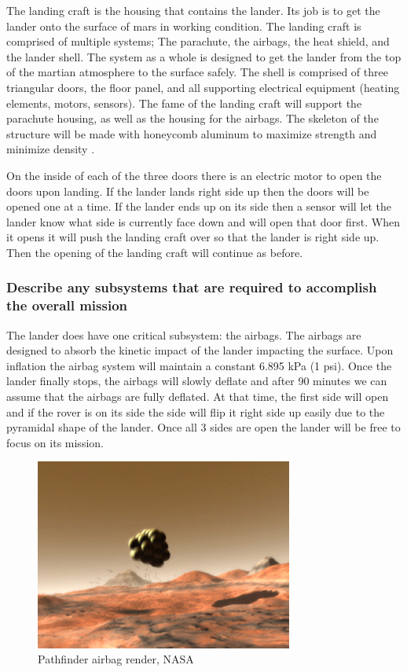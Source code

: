 \documentclass[%
 portrait,
 aapm,
 mph,%
 amsmath,amssymb,
 reprint,%
]{revtex4-2}
\begin{document}
The landing craft is the housing that contains the lander.  Its job is to get the lander onto the surface of mars in working condition.  The landing craft is comprised of multiple systems; The parachute, the airbags, the heat shield, and the lander shell.  The system as a whole is designed to get the lander from the top of the martian atmosphere to the surface safely.  The shell is comprised of three triangular doors, the floor panel, and all supporting electrical equipment (heating elements, motors, sensors).  The fame of the landing craft will support the parachute housing, as well as the housing for the airbags.  The skeleton of the structure will be made with honeycomb aluminum to maximize strength and minimize density \cite{zylonByToyobo}.

On the inside of each of the three doors there is an electric motor to open the doors upon landing.  If the lander lands right side up then the doors will be opened one at a time.  If the lander ends up on its side then a sensor will let the lander know what side is currently face down and will open that door first.  When it opens it will push the landing craft over so that the lander is right side up.  Then the opening of the landing craft will continue as before. 


\subsubsection{Describe any subsystems that are required to accomplish the overall mission}
The lander does have one critical subsystem: the airbags. The airbags are designed to absorb the kinetic impact of the lander impacting the surface.  Upon inflation the airbag system will maintain a constant 6.895 kPa (1 psi).  Once the lander finally stops, the airbags will slowly deflate and after 90 minutes we can assume that the airbags are fully deflated.  At that time, the first side will open and if the rover is on its side the side will flip it right side up easily due to the pyramidal shape of the lander.  Once all 3 sides are open the lander will be free to focus on its mission. 
\begin{figure}[htp]
  \includegraphics[width=240pt]{DescentandLanding/PFairbagRender.png}
   \caption{Pathfinder airbag render, NASA}
\end{figure} 
\end{document}
